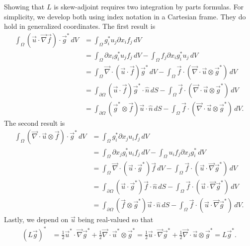 \documentclass[letterpaper,reqno,11pt]{amsart}
\newcommand{\vecnabla}{\ensuremath{\vec{\nabla}}}
\begin{document}
Showing that $L$ is skew-adjoint requires two integration by parts formulas.
For simplicity, we develop both using index notation in a Cartesian frame. They
do hold in generalized coordinates.  The first result is
\begin{align}
  \int_{\Omega}
    \left(\vec{u}\cdot\vecnabla\vec{f}\right)\cdot{}\vec{g}^{\ast}
    \,d\!V
  &=
  \int_{\Omega} g_i^{\ast} u_j \partial\!x_{i} f_j \,d\!V
  \\
  &=
    \int_{\Omega} \partial\!x_{i} g_i^{\ast} u_j f_j \,d\!V
  - \int_{\Omega} f_j \partial\!x_{i} g_i^{\ast} u_j \,d\!V
  \\
  &=
    \int_{\Omega}
      \vecnabla\cdot\left(\vec{u}\cdot\vec{f}\right)\vec{g}^{\ast}
      \,d\!V
  - \int_{\Omega}
      \vec{f}\cdot\left(\vecnabla\cdot\vec{u}\otimes\vec{g}^{\ast}\right)
      \,d\!V
  \\
  &=
    \int_{\partial\Omega}
      \left(\vec{u}\cdot\vec{f}\right)\vec{g}^{\ast}\cdot\hat{n}
      \,d\!S
  - \int_{\Omega}
      \vec{f}\cdot\left(\vecnabla\cdot\vec{u}\otimes\vec{g}^{\ast}\right)
      \,d\!V
  \\
  &=
    \int_{\partial\Omega}
      \left(\vec{g}^{\ast}\otimes\vec{f}\right)\vec{u}\cdot\hat{n}
      \,d\!S
  - \int_{\Omega}
      \vec{f}\cdot\left(\vecnabla\cdot\vec{u}\otimes\vec{g}^{\ast}\right)
      \,d\!V
  .
\end{align}
The second result is
\begin{align}
  \int_{\Omega}
    \left(\vecnabla\cdot\vec{u}\otimes\vec{f}\right)\cdot\vec{g}^{\ast}
    \,d\!V
  &=
  \int_{\Omega} g_i^{\ast} \partial\!x_{j} u_i f_j \,d\!V
  \\
  &=
    \int_{\Omega} \partial\!x_{j} g_i^{\ast} u_i f_j \,d\!V
  - \int_{\Omega} u_i f_j \partial\!x_{j} g_i^{\ast} \,d\!V
  \\
  &=
    \int_{\Omega}
      \vecnabla\cdot\left(\vec{u}\cdot\vec{g}^{\ast}\right)\vec{f}
      \,d\!V
  - \int_{\Omega}
      \vec{f}\cdot\left(\vec{u}\cdot\vecnabla\vec{g}^{\ast}\right)
      \,d\!V
  \\
  &=
    \int_{\partial\Omega}
      \left(\vec{u}\cdot\vec{g}^{\ast}\right)\vec{f}\cdot\hat{n}
      \,d\!S
  - \int_{\Omega}
      \vec{f}\cdot\left(\vec{u}\cdot\vecnabla\vec{g}^{\ast}\right)
      \,d\!V
  \\
  &=
    \int_{\partial\Omega}
      \left(\vec{f}\otimes\vec{g}^{\ast}\right)\vec{u}\cdot\hat{n}
      \,d\!S
  - \int_{\Omega}
      \vec{f}\cdot\left(\vec{u}\cdot\vecnabla\vec{g}^{\ast}\right)
      \,d\!V
  .
\end{align}
Lastly, we depend on $\vec{u}$ being real-valued so that
\begin{align}
  \left(L\vec{g}\right)^{\ast}
  &=
      \frac{1}{2}\vec{u}^{\ast}\cdot\vecnabla{}\vec{g}^{\ast}
    + \frac{1}{2}\vecnabla\cdot\vec{u}^{\ast}\otimes\vec{g}^{\ast}
  =
      \frac{1}{2}\vec{u}\cdot\vecnabla{}\vec{g}^{\ast}
    + \frac{1}{2}\vecnabla\cdot\vec{u}\otimes\vec{g}^{\ast}
  = L\vec{g}^{\ast}
  .
\end{align}
\end{document}
